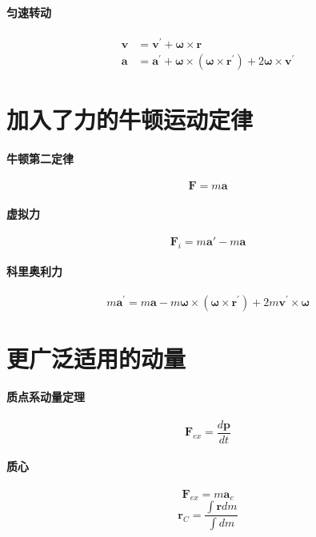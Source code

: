 \documentclass[12pt,a4paper]{article}
\numberwithin{equation}{section}
\begin{document}
\begin{CJK}{UTF8}{gbsn}
\paragraph{匀速转动}
\begin{align}
  \bm{v} & = \bm{v}^{\prime} + \bm{\omega} \times \bm{r} \\
  \bm{a} & =\bm{a}^{\prime} + \bm{\omega} \times (\bm{\omega} \times \bm{r}^{\prime} )+2 \bm{\omega} \times \bm{v}^{\prime}
\end{align}

\section{加入了力的牛顿运动定律}
\paragraph{牛顿第二定律}
\begin{equation}
  \bm{F}=m\bm{a}
\end{equation}

\paragraph{虚拟力}
\begin{equation}
  \bm{F}_i=m\bm{a'}-m\bm{a}
\end{equation}

\paragraph{科里奥利力}

\begin{equation}
 m \bm{a}^{\prime}  =m \bm{a} - m \bm{\omega} \times (\bm{\omega} \times \bm{r}^{\prime} )+ 2 m \bm{v}^{\prime} \times  \bm{\omega}
\end{equation}

\section{更广泛适用的动量}
\paragraph{质点系动量定理}
\begin{equation}
  \bm{F}_{ex}=\frac{d\bm{p}}{dt}
\end{equation}

\paragraph{质心}
\begin{equation}
  \bm{F}_{ex}=m\bm{a}_c
\end{equation}
\begin{equation}
  \bm{r}_C=\frac{\int \bm{r} dm}{\int dm}
\end{equation}


\end{CJK}
\end{document}
